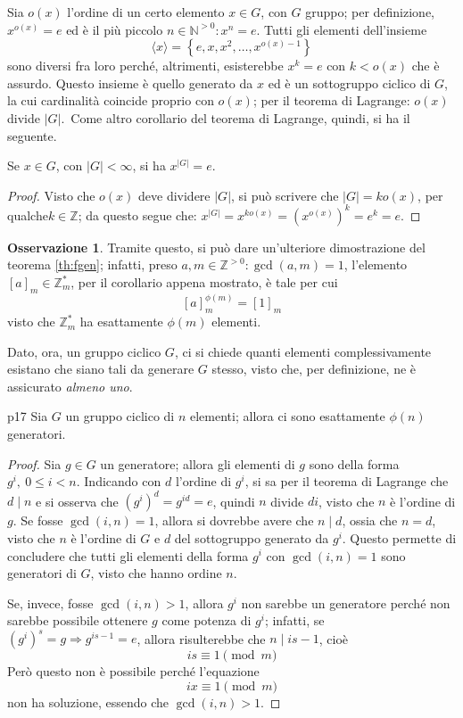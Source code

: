 \documentclass[11pt, a4paper]{scrartcl}
\theoremstyle{definition}
\numberwithin{esempio}{section}
\theoremstyle{definition}
\newtheorem{obs}{Osservazione}
\numberwithin{obs}{section}
\numberwithin{nota}{section}
\numberwithin{equation}{subsection}
\begin{document}
Sia $o(x)$ l'ordine di un certo elemento $x \in G$, con $G$ gruppo; per definizione, $x^{o(x)} = e$ ed \`e il pi\`u piccolo $n \in \mathbb{N}^{>0}  : x^n = e$.
Tutti gli elementi dell'insieme
\[
\langle x \rangle=\left\{ e , x ,x^2 ,\ldots, x^{o(x) -1}  \right\} 
\] 
sono diversi fra loro perch\'e, altrimenti, esisterebbe $x^k =e$ con $k<o(x)$ che \`e assurdo.
Questo insieme \`e quello generato da $x$ ed \`e un sottogruppo ciclico di $G$, la cui cardinalit\`a coincide proprio con $o(x)$; per il teorema di Lagrange: $o(x) $ divide $ \lvert G \rvert $.\
Come altro corollario del teorema di Lagrange, quindi, si ha il seguente.
\begin{corollario}
	{}{}
	Se $x \in G$, con $|G| < \infty$, si ha $x^{|G|} =e $.
	\begin{proof}
		Visto che $o(x)$ deve dividere $|G|$, si pu\`o scrivere che $|G| =k o(x)$, per qualche$ k \in \mathbb{Z}$; da questo segue che: $x^{|G|}  = x ^{k o(x)} = \left(x^{o(x)} \right) ^k= e^k = e$.
	\end{proof}
\end{corollario}
\begin{obs}
Tramite questo, si pu\`o dare un'ulteriore dimostrazione del teorema \ref{th:fgen}; infatti, preso $a,m \in \mathbb{Z}^{>0} : \operatorname{gcd}(a,m) =1$, l'elemento $[a]_m \in \mathbb{Z}^*_m$, per il corollario appena mostrato, \`e tale per cui
\[
	[a]_m^{\phi (m)} = [1]_m
\] 
visto che $\mathbb{Z}^*_m$ ha esattamente $\phi (m)$ elementi.
\end{obs}
Dato, ora, un gruppo ciclico $G$, ci si chiede quanti elementi complessivamente esistano che siano tali da generare $G$ stesso, visto che, per definizione, ne \`e assicurato \textit{almeno uno}.
\begin{prop}
	{}{p17}
	Sia $G$ un gruppo ciclico di $n$ elementi; allora ci sono esattamente $\phi (n)$ generatori.
	\begin{proof}
		Sia $g \in G$ un generatore; allora gli elementi di $g$ sono della forma $g^i, \ 0\le i <n $. 
		Indicando con $d$ l'ordine di $g^i$, si sa per il teorema di Lagrange che $d  \mid n$ e si osserva che $(g^i)^d = g^{id} =e$, quindi $n$ divide $di$, visto che $n$ \`e l'ordine di $g$.
		Se fosse $\operatorname{gcd}(i,n) =1$, allora si dovrebbe avere che $n  \mid  d$, ossia che $n = d$, visto che $n$ \`e l'ordine di $G$ e $d$ del sottogruppo generato da $g^i$.
		Questo permette di concludere che tutti gli elementi della forma $g^i$ con $\operatorname{gcd}(i,n) =1$ sono generatori di $G$, visto che hanno ordine $n$.

		Se, invece, fosse $\operatorname{gcd}(i,n) >1$, allora $g^i$ non sarebbe un generatore perch\'e non sarebbe possibile ottenere $g$ come potenza di $g^i$; infatti, se $(g^i)^s = g \Rightarrow  g^{is -1 }  = e$, allora risulterebbe che $n  \mid is -1$, cio\`e 
		\[
		is \equiv 1\pmod{m} 
		\] 
		Per\`o questo non \`e possibile perch\'e l'equazione 
		\[
		ix \equiv 1 \pmod{m} 
		\] 
		non ha soluzione, essendo che $\operatorname{gcd}(i,n) >1$.
	\end{proof}
\end{prop}
\end{document}
